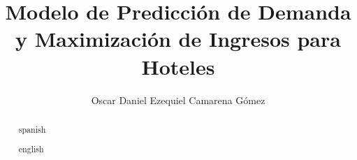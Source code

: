 \documentclass{tesisITAM}
\title{Modelo de Predicción de Demanda y Maximización de Ingresos para Hoteles}
\author{Oscar Daniel Ezequiel Camarena Gómez}
\begin{document}
	\maketitle
	\publicationrights


	\begin{abstract}{spanish}
	
	\end{abstract}

	\begin{abstract}{english}
	
	\end{abstract}


	\setcounter{page}{1}

	\tableofcontents
	\listoffigures
	\listoftables
	\newpage

	\setcounter{page}{1}


	

	

	

	

	
	
	
	
	
	
	
	
	
	
	

	\appendix

	\clearpage
	

	
	 
\end{document}
